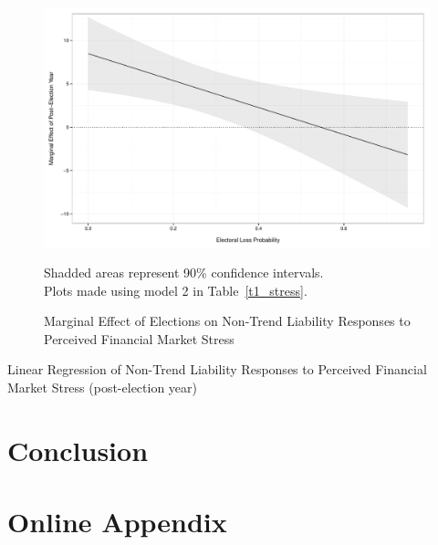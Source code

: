 \documentclass[]{article}
\begin{document}
\begin{figure}
    \caption{Marginal Effect of Elections on Non-Trend Liability Responses to Perceived Financial Market Stress}
    \label{me_liab_stress}

    \begin{center}
        \includegraphics[scale=0.5]{analysis/figures/me_liab_stress.pdf}
    \end{center}

    {\scriptsize{Shadded areas represent 90\% confidence intervals. \\
    Plots made using model 2 in Table~\ref{t1_stress}.}}

\end{figure}

\begin{table}
    \caption{Linear Regression of Non-Trend Liability Responses to Perceived Financial Market Stress (post-election year)}
    \label{t1_stress}

    \begin{center}
        
    \end{center}

\end{table}


\section*{Conclusion}







\section{Online Appendix}


\end{document}
